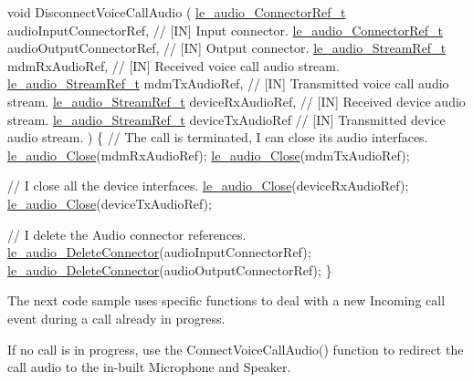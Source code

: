 \begin{DoxyCode}
\textcolor{keywordtype}{void} DisconnectVoiceCallAudio
(
    \hyperlink{le__audio__interface_8h_ab819480f4ce3f36e62b6a4e327668304}{le\_audio\_ConnectorRef\_t}  audioInputConnectorRef,  \textcolor{comment}{// [IN] Input connector.}
    \hyperlink{le__audio__interface_8h_ab819480f4ce3f36e62b6a4e327668304}{le\_audio\_ConnectorRef\_t}  audioOutputConnectorRef, \textcolor{comment}{// [IN] Output connector.}
    \hyperlink{le__audio__interface_8h_a9a46ff5a5afa61f1bc76120ab9e4da0a}{le\_audio\_StreamRef\_t}     mdmRxAudioRef,           \textcolor{comment}{// [IN] Received voice call audio
       stream.}
    \hyperlink{le__audio__interface_8h_a9a46ff5a5afa61f1bc76120ab9e4da0a}{le\_audio\_StreamRef\_t}     mdmTxAudioRef,           \textcolor{comment}{// [IN] Transmitted voice call
       audio stream.}
    \hyperlink{le__audio__interface_8h_a9a46ff5a5afa61f1bc76120ab9e4da0a}{le\_audio\_StreamRef\_t}     deviceRxAudioRef,        \textcolor{comment}{// [IN] Received device audio
       stream.}
    \hyperlink{le__audio__interface_8h_a9a46ff5a5afa61f1bc76120ab9e4da0a}{le\_audio\_StreamRef\_t}     deviceTxAudioRef         \textcolor{comment}{// [IN] Transmitted device audio
       stream.}
)
\{
    \textcolor{comment}{// The call is terminated, I can close its audio interfaces.}
    \hyperlink{le__audio__interface_8h_abafeb411da7b1a14b2d5777fc1d3e394}{le\_audio\_Close}(mdmRxAudioRef);
    \hyperlink{le__audio__interface_8h_abafeb411da7b1a14b2d5777fc1d3e394}{le\_audio\_Close}(mdmTxAudioRef);

    \textcolor{comment}{// I close all the device interfaces.}
    \hyperlink{le__audio__interface_8h_abafeb411da7b1a14b2d5777fc1d3e394}{le\_audio\_Close}(deviceRxAudioRef);
    \hyperlink{le__audio__interface_8h_abafeb411da7b1a14b2d5777fc1d3e394}{le\_audio\_Close}(deviceTxAudioRef);

    \textcolor{comment}{// I delete the Audio connector references.}
    \hyperlink{le__audio__interface_8h_a3f40b13ff980040503927f59bb3e86a9}{le\_audio\_DeleteConnector}(audioInputConnectorRef);
    \hyperlink{le__audio__interface_8h_a3f40b13ff980040503927f59bb3e86a9}{le\_audio\_DeleteConnector}(audioOutputConnectorRef);
\}
\end{DoxyCode}


The next code sample uses specific functions to deal with a new \textquotesingle{}Incoming call\textquotesingle{} event during a call already in progress.

If no call is in progress, use the Connect\+Voice\+Call\+Audio() function to redirect the call audio to the in-\/built Microphone and Speaker.

